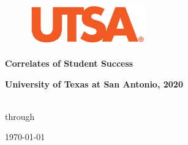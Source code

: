 
\begin{center}

	\begin{figure}[th]
		\centering
		\includegraphics[width=5cm]{UTSAVectorOrange.pdf}
		\label{fig:Cover}
	\end{figure}

	{\Huge \textbf{Correlates of Student Success} } 

	\vspace{.5cm}

	{\Large \textbf{University of Texas at San Antonio, 2020}}

	\vspace{8cm}

	{\Huge \textbf{\College} }\\
	{\Large 
	\StartDate \hspace{2mm} through \EndDate\\
	\Grades}


	\vspace{0.5cm}

	{\Large \textbf{\Department} }

	\vspace{8cm}

	{\Large \today}

	\vspace{\fill}

	

\end{center}

\newpage


\pagestyle{cb} %

\tableofcontents

\newpage


